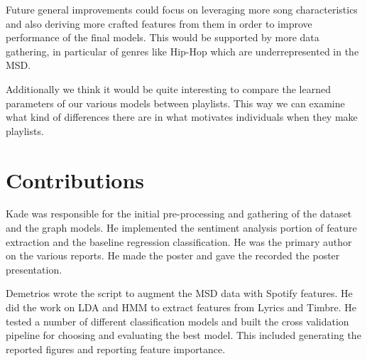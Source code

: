 \documentclass[acmtog]{acmart}
\begin{document}
Future general improvements could focus on leveraging more song characteristics and also deriving more crafted features from them in order to improve performance of the final models. This would be supported by more data gathering, in particular of genres like Hip-Hop which are underrepresented in the MSD.

Additionally we think it would be quite interesting to compare the learned parameters of our various models between playlists. This way we can examine what kind of differences there are in what motivates individuals when they make playlists.


\section{Contributions}
Kade was responsible for the initial pre-processing and gathering of the dataset and the graph models. He implemented the sentiment analysis portion of feature extraction and the baseline regression classification. He was the primary author on the various reports. He made the poster and gave the recorded the poster presentation.

Demetrios wrote the script to augment the MSD data with Spotify features. He did the work on LDA and HMM to extract features from Lyrics and Timbre. He tested a number of different classification models and built the cross validation pipeline for choosing and evaluating the best model. This included generating the reported figures and reporting feature importance.


{}

%
\end{document}
